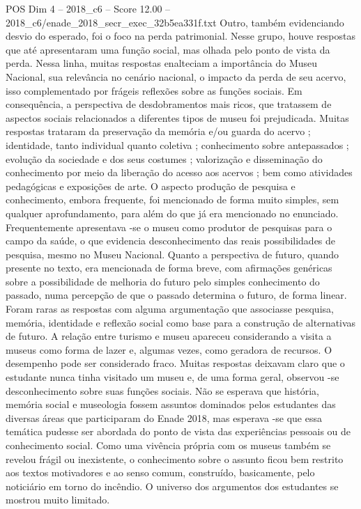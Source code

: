 \begin{textsample}{POS Dim 4 – 2018\_c6 – Score 12.00 – 2018\_c6/enade\_2018\_secr\_exec\_32b5ea331f.txt}
Outro, também evidenciando desvio do esperado, foi o foco na perda patrimonial.
Nesse grupo, houve respostas que até apresentaram uma função social, mas olhada pelo ponto de vista da perda.
Nessa linha, muitas respostas enalteciam a importância do Museu Nacional, sua relevância no cenário nacional, o impacto da perda de seu acervo, isso complementado por frágeis reflexões sobre as funções sociais.
Em consequência, a perspectiva de desdobramentos mais ricos, que tratassem de aspectos sociais relacionados a diferentes tipos de museu foi prejudicada.
Muitas respostas trataram da preservação da memória e/ou guarda do acervo ; identidade, tanto individual quanto coletiva ; conhecimento sobre antepassados ; evolução da sociedade e dos seus costumes ; valorização e disseminação do conhecimento por meio da liberação do acesso aos acervos ; bem como atividades pedagógicas e exposições de arte.
O aspecto produção de pesquisa e conhecimento, embora frequente, foi mencionado de forma muito simples, sem qualquer aprofundamento, para além do que já era mencionado no enunciado.
Frequentemente apresentava -se o museu como produtor de pesquisas para o campo da saúde, o que evidencia desconhecimento das reais possibilidades de pesquisa, mesmo no Museu Nacional.
Quanto a perspectiva de futuro, quando presente no texto, era mencionada de forma breve, com afirmações genéricas sobre a possibilidade de melhoria do futuro pelo simples conhecimento do passado, numa percepção de que o passado determina o futuro, de forma linear.
Foram raras as respostas com alguma argumentação que associasse pesquisa, memória, identidade e reflexão social como base para a construção de alternativas de futuro.
A relação entre turismo e museu apareceu considerando a visita a museus como forma de lazer e, algumas vezes, como geradora de recursos.
O desempenho pode ser considerado fraco.
Muitas respostas deixavam claro que o estudante nunca tinha visitado um museu e, de uma forma geral, observou -se desconhecimento sobre suas funções sociais.
Não se esperava que história, memória social e museologia fossem assuntos dominados pelos estudantes das diversas áreas que participaram do Enade 2018, mas esperava -se que essa temática pudesse ser abordada do ponto de vista das experiências pessoais ou de conhecimento social.
Como uma vivência própria com os museus também se revelou frágil ou inexistente, o conhecimento sobre o assunto ficou bem restrito aos textos motivadores e ao senso comum, construído, basicamente, pelo noticiário em torno do incêndio.
O universo dos argumentos dos estudantes se mostrou muito limitado.

\end{textsample}
